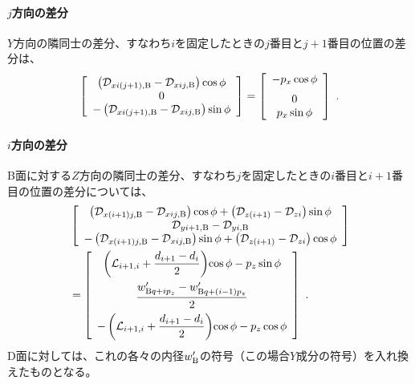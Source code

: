\paragraph{$j$方向の差分}\noindent
$Y$方向の隣同士の差分、すなわち$i$を固定したときの$j$番目と$j+1$番目の位置の差分は、
\begin{align*}
  \left[
  \begin{array}{c}
    \left(\mathcal D_{xi(j+1),\text B}-\mathcal D_{xij,\text B}\right)\cos\phi\\
    0\\
    -\left(\mathcal D_{xi(j+1),\text B}-\mathcal D_{xij,\text B}\right)\sin\phi
  \end{array}
  \right]
  = \left[
    \begin{array}{c}
      -p_x\cos\phi\\[6pt]
      0\\
      p_x\sin\phi
    \end{array}
    \right]\ .
\end{align*}


\paragraph{$i$方向の差分}\noindent
B面に対する$Z$方向の隣同士の差分、すなわち$j$を固定したときの$i$番目と$i+1$番目の位置の差分については、
\begin{align*}
 &\left[
  \begin{array}{c}
    \left(\mathcal D_{x(i+1)j,\text B}-\mathcal D_{xij,\text B}\right)\cos\phi
    +\left(\mathcal D_{z(i+1)}-\mathcal D_{zi}\right)\sin\phi\\
    \mathcal D_{yi+1,\text B}-\mathcal D_{yi,\text B}\\
    -\left(\mathcal D_{x(i+1)j,\text B}-\mathcal D_{xij,\text B}\right)\sin\phi
    +\left(\mathcal D_{z(i+1)}-\mathcal D_{zi}\right)\cos\phi
  \end{array}
  \right]\\
 &= \left[
    \begin{array}{c}
      \displaystyle\left(\mathcal L_{i+1, i}+\frac{d_{i+1}-d_i}2\right)\!\cos\phi-p_z\sin\phi\\[10pt]
      \displaystyle\frac{w'_{\text Bq+ip_z}-w'_{\text Bq+(i-1)p_z}}2\\[8pt]
      \displaystyle-\left(\mathcal L_{i+1, i}+\frac{d_{i+1}-d_i}2\right)\!\cos\phi-p_z\cos\phi
    \end{array}
    \right]\ .
\end{align*}
D面に対しては、これの各々の内径$w_\text B'$の符号（この場合$Y$成分の符号）を入れ換えたものとなる。






